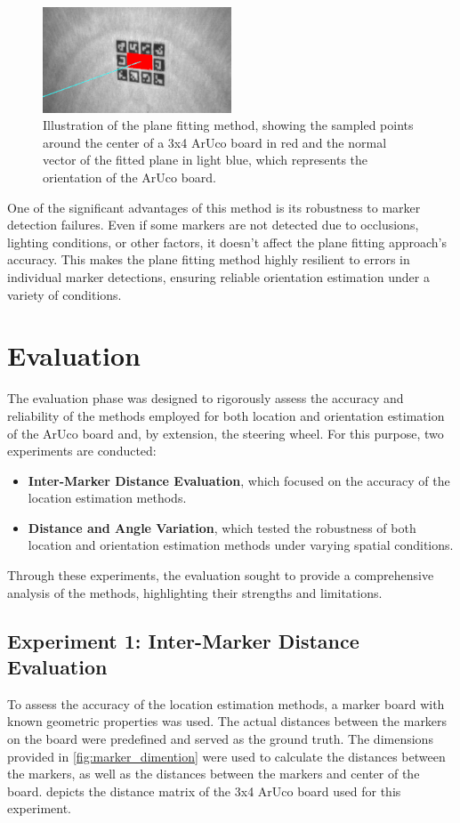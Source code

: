 \begin{figure}[htpb]
    \centering
    \includegraphics[width=0.5\textwidth]{media/chapter 5/plane_fitting.png}
    \caption{Illustration of the plane fitting method, showing the 
    sampled points around the center of a 3x4 ArUco board in red and the 
    normal vector of the fitted plane in light blue, which represents 
    the orientation of the ArUco board.}
    \label{fig:plane_fitting}
\end{figure}

One of the significant advantages of this method is its 
robustness to marker detection failures. Even if some markers 
are not detected due to occlusions, lighting conditions, or 
other factors, it doesn't affect the plane fitting approach's accuracy. This makes the plane fitting method highly 
resilient to errors in individual marker detections, ensuring 
reliable orientation estimation under a variety of conditions.



\section{Evaluation}
The evaluation phase was designed to rigorously assess the accuracy 
and reliability of the methods employed for both location and 
orientation estimation of the ArUco board and, by extension, the 
steering wheel. For this purpose, two experiments are conducted:
\begin{itemize}
    \item \textbf{Inter-Marker Distance Evaluation}, which focused on the 
    accuracy of the location estimation methods.
    \item \textbf{Distance and Angle Variation}, which tested the robustness 
    of both location and orientation estimation methods under varying 
    spatial conditions.
\end{itemize}

Through these experiments, the evaluation sought to provide a 
comprehensive analysis of the methods, highlighting their strengths 
and limitations.

\subsection{Experiment 1: Inter-Marker Distance Evaluation}
To assess the accuracy of the location estimation methods, a marker board with known geometric properties was used. The actual distances between the markers on the board were predefined and served as the ground truth. The dimensions provided in \cref{fig:marker_dimention} were used to calculate the distances between the markers, as well as the distances between the markers and center of the board.  depicts the distance matrix of the 3x4 ArUco board used for this experiment.


